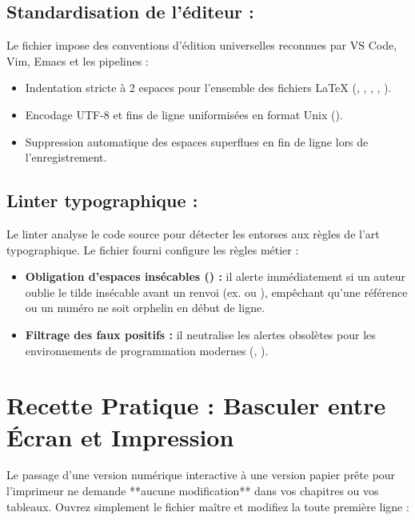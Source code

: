 \subsection{Standardisation de l'éditeur : }
Le fichier  impose des conventions d'édition universelles reconnues par VS Code, Vim, Emacs et les pipelines  :
\begin{itemize}
  \item Indentation stricte à 2 espaces pour l'ensemble des fichiers \LaTeX{} (, , , , ).
  \item Encodage UTF-8 et fins de ligne uniformisées en format Unix ().
  \item Suppression automatique des espaces superflues en fin de ligne lors de l'enregistrement.
\end{itemize}

\subsection{Linter typographique : }
Le linter  analyse le code source pour détecter les entorses aux règles de l'art typographique.
Le fichier  fourni configure les règles métier :
\begin{itemize}
  \item \textbf{Obligation d'espaces insécables (\code{\textasciitilde}) :}
  il alerte immédiatement si un auteur oublie le tilde insécable avant un renvoi
  (ex.  ou ),
  empêchant qu'une référence ou un numéro ne soit orphelin en début de ligne.
  \item \textbf{Filtrage des faux positifs :}
  il neutralise les alertes obsolètes pour les environnements de programmation modernes (, ).
\end{itemize}

\section{Recette Pratique : Basculer entre Écran et Impression}
\label{sec:recette-bascule}

Le passage d'une version numérique interactive à une version papier prête pour l'imprimeur
ne demande **aucune modification** dans vos chapitres ou vos tableaux.
Ouvrez simplement le fichier maître  et modifiez la toute première ligne :

